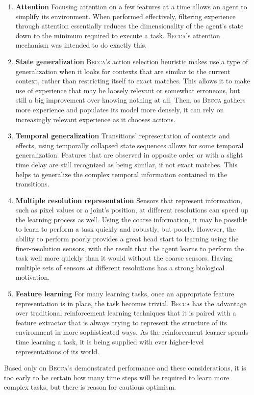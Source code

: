 \begin{enumerate} 
\item{\bf Attention} Focusing attention on a few features at a time allows an agent to simplify its environment. When performed effectively, filtering experience through attention essentially reduces the dimensionality of the agent's state down to the minimum required to execute a task.  \textsc{Becca}'s attention mechanism was intended to do exactly this.
\item {\bf State generalization} \textsc{Becca}'s action selection heuristic makes use a type of generalization when it looks for contexts that are similar to the current context, rather than restricting itself to exact matches. This allows it to make use of experience that may be loosely relevant or somewhat erroneous, but still a big improvement over knowing nothing at all. Then, as \textsc{Becca} gathers more experience and populates its model more densely, it can rely on increasingly relevant experience as it chooses actions.
\item {\bf Temporal generalization} Transitions' representation of contexts and effects, using temporally collapsed state sequences allows for some temporal generalization. Features that are observed in opposite order or with a slight time delay are still recognized as being similar, if not exact matches. This helps to generalize the complex temporal information contained in the transitions.
\item {\bf Multiple resolution representation} Sensors that represent information, such as pixel values or a joint's position, at different resolutions can speed up the learning process as well. Using the coarse information, it may be possible to learn to perform a task quickly and robustly, but poorly. However, the ability to perform poorly provides a great head start to learning using the finer-resolution sensors, with the result that the agent learns to perform the task well more quickly than it would without the coarse sensors. Having multiple sets of sensors at different resolutions has a strong biological motivation.
\item {\bf Feature learning} For many learning tasks, once an appropriate feature representation is in place, the task becomes trivial. \textsc{Becca} has the advantage over traditional reinforcement learning techniques that it is paired with a feature extractor that is always trying to represent the structure of its environment in more sophisticated ways. As the reinforcement learner spends time learning a task, it is being supplied with ever higher-level representations of its world.
\end{enumerate}

Based only on \textsc{Becca}'s demonstrated performance and these considerations, it is too early to be certain how many time steps will be required to learn more complex tasks, but there is reason for cautious optimism. 
